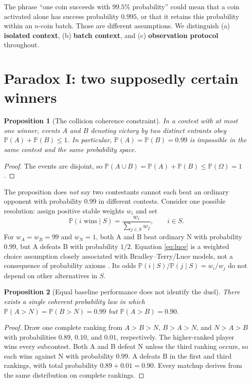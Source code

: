 \documentclass[11pt,a4paper]{article}
\newtheorem{proposition}{Proposition}
\newcommand{\PP}{\mathbb{P}}
\begin{document}
The phrase ``one coin succeeds with $99.5\%$ probability'' could mean that a coin activated alone has success probability $0.995$, or that it retains this probability within an $n$-coin batch. Those are different assumptions. We distinguish (a) \textbf{isolated context}, (b) \textbf{batch context}, and (c) \textbf{observation protocol} throughout.

\section{Paradox I: two supposedly certain winners}

\begin{proposition}[The collision coherence constraint]\label{prop:collision}
In a contest with at most one winner, events $A$ and $B$ denoting victory by two distinct entrants obey $\PP(A)+\PP(B)\leq1$. In particular, $\PP(A)=\PP(B)=0.99$ is impossible in the same contest and the same probability space.
\end{proposition}
\begin{proof}
The events are disjoint, so $\PP(A\cup B)=\PP(A)+\PP(B)\leq\PP(\Omega)=1$.
\end{proof}

The proposition does \emph{not} say two contestants cannot each beat an ordinary opponent with probability $0.99$ in different contests. Consider one possible resolution: assign positive stable weights $w_i$ and set
\begin{equation}\label{eq:luce}
\PP(i\text{ wins}\mid S)=\frac{w_i}{\sum_{j\in S}w_j},\qquad i\in S.
\end{equation}
For $w_A=w_B=99$ and $w_N=1$, both A and B beat ordinary N with probability $0.99$, but A defeats B with probability $1/2$. Equation \eqref{eq:luce} is a weighted choice assumption closely associated with Bradley--Terry/Luce models, not a consequence of probability axioms \cite{bradley,luce}. Its odds $\PP(i\mid S)/\PP(j\mid S)=w_i/w_j$ do not depend on other alternatives in $S$.

\begin{proposition}[Equal baseline performance does not identify the duel]\label{prop:ranking}
There exists a single coherent probability law in which $\PP(A>N)=\PP(B>N)=0.99$ but $\PP(A>B)=0.90$.
\end{proposition}
\begin{proof}
Draw one complete ranking from $A>B>N$, $B>A>N$, and $N>A>B$ with probabilities $0.89$, $0.10$, and $0.01$, respectively. The higher-ranked player wins every subcontest. Both A and B defeat N unless the third ranking occurs, so each wins against N with probability $0.99$. A defeats B in the first and third rankings, with total probability $0.89+0.01=0.90$. Every matchup derives from the same distribution on complete rankings.
\end{proof}
\end{document}
